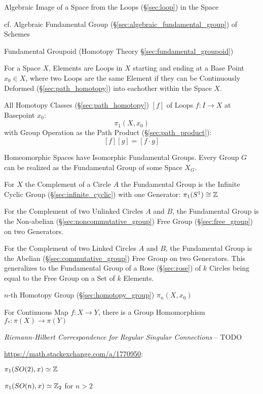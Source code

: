 Algebraic Image of a Space from the Loops (\S\ref{sec:loop}) in the Space

cf. Algebraic Fundamental Group (\S\ref{sec:algebraic_fundamental_group}) of
Schemes

\fist Fundamental Groupoid (Homotopy Theory \S\ref{sec:fundamental_groupoid})

For a Space $X$, Elements are Loops in $X$ starting and ending at a Base Point
$x_0 \in X$, where two Loops are the same Element if they can be Continuously
Deformed (\S\ref{sec:path_homotopy}) into eachother within the Space $X$.

All Homotopy Classes (\S\ref{sec:path_homotopy}) $[f]$ of Loops $f : I
\rightarrow X$ at Basepoint $x_0$:
\[
  \pi_1(X,x_0)
\]
with Group Operation as the Path Product (\S\ref{sec:path_product}):
\[
  [f][g] = [f \cdot g]
\]

Homeomorphic Spaces have Isomorphic Fundamental Groups. Every Group $G$ can be
realized as the Fundamental Group of some Space $X_G$. \cite{hatcher02}

For $X$ the Complement of a Circle $A$ the Fundamental Group is the Infinite
Cyclic Group (\S\ref{sec:infinite_cyclic}) with one Generator: $\pi_1(S^1) \cong
\mathbb{Z}$

For the Complement of two Unlinked Circles $A$ and $B$, the Fundamental Group is
the Non-abelian (\S\ref{sec:noncommutative_group}) Free Group
(\S\ref{sec:free_group}) on two Generators.

For the Complement of two Linked Circles $A$ and $B$, the Fundamental Group is
the Abelian (\S\ref{sec:commutative_group}) Free Group on two Generators.
\cite{hatcher02} This generalizes to the Fundamental Group of a Rose
(\S\ref{sec:rose}) of $k$ Circles being equal to the Free Group on a Set of $k$
Elements.

$n$-th Homotopy Group (\S\ref{sec:homotopy_group}) $\pi_n(X,x_0)$

For Continuous Map $f : X \rightarrow Y$, there is a Group Homomorphism $f_* :
\pi (X) \rightarrow \pi (Y)$


\emph{Riemann-Hilbert Correspondence for Regular Singular Connections} -- TODO

\asterism

\url{https://math.stackexchange.com/a/1770950}:

$\pi_1(SO(2), x) \simeq \mathbb{Z}$

$\pi_1(SO(n), x) \simeq \mathbb{Z}_2$ for $n > 2$



